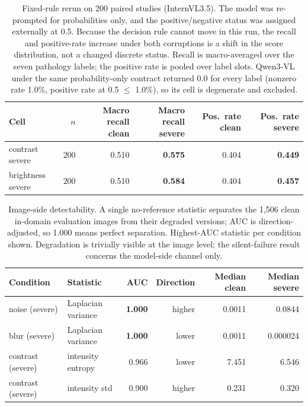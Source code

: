 \begin{table}[H]
\centering
\small
\caption{Fixed-rule rerun on 200 paired studies (InternVL3.5). The model was re-prompted for probabilities only, and the positive/negative status was assigned externally at 0.5. Because the decision rule cannot move in this run, the recall and positive-rate increase under both corruptions is a shift in the score distribution, not a changed discrete status. Recall is macro-averaged over the seven pathology labels; the positive rate is pooled over label slots. Qwen3-VL under the same probability-only contract returned 0.0 for every label (nonzero rate 1.0\%, positive rate at 0.5 $\le$ 1.0\%), so its cell is degenerate and excluded.}
\label{tab:fixedrerun}
\begin{tabular}{lrrrrr}
\toprule
Cell & $n$ & Macro recall clean & Macro recall severe & Pos.\ rate clean & Pos.\ rate severe \\
\midrule
contrast severe & 200 & 0.510 & \textbf{0.575} & 0.404 & \textbf{0.449} \\
brightness severe & 200 & 0.510 & \textbf{0.584} & 0.404 & \textbf{0.457} \\
\bottomrule
\end{tabular}
\end{table}

\clearpage
\begin{table}[H]
\centering
\footnotesize
\caption{Image-side detectability. A single no-reference statistic separates the 1,506 clean in-domain evaluation images from their degraded versions; AUC is direction-adjusted, so 1.000 means perfect separation. Highest-AUC statistic per condition shown. Degradation is trivially visible at the image level; the silent-failure result concerns the model-side channel only.}
\label{tab:imageside}
\begin{tabular}{llrrrr}
\toprule
Condition & Statistic & AUC & Direction & Median clean & Median severe \\
\midrule
noise (severe) & Laplacian variance & \textbf{1.000} & higher & 0.0011 & 0.0844 \\
blur (severe) & Laplacian variance & \textbf{1.000} & lower & 0.0011 & 0.000024 \\
contrast (severe) & intensity entropy & 0.966 & lower & 7.451 & 6.546 \\
contrast (severe) & intensity std & 0.900 & higher & 0.231 & 0.320 \\
\bottomrule
\end{tabular}
\end{table}

